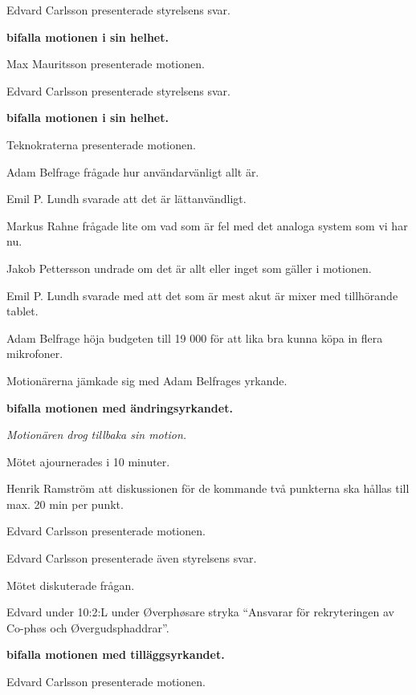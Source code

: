 \documentclass[10pt]{article}
\begin{document}
\begin{paragrafer}
\begin{paragrafer}
    Edvard Carlsson presenterade styrelsens svar.

    \textbf{\Mba bifalla motionen i sin helhet.}

    Max Mauritsson presenterade motionen.

    Edvard Carlsson presenterade styrelsens svar.

    \textbf{\Mba bifalla motionen i sin helhet.}

    Teknokraterna presenterade motionen.

    Adam Belfrage frågade hur användarvänligt allt är.

    Emil P. Lundh svarade att det är lättanvändligt.

    Markus Rahne frågade lite om vad som är fel med det analoga system som vi har nu.

    Jakob Pettersson undrade om det är allt eller inget som gäller i motionen.

    Emil P. Lundh svarade med att det som är mest akut är mixer med tillhörande tablet.

    Adam Belfrage \ypa höja budgeten till 19 000 för att lika bra kunna köpa in flera mikrofoner.

    Motionärerna jämkade sig med Adam Belfrages yrkande.

    \textbf{\Mba bifalla motionen med ändringsyrkandet.}

    
    \textit{Motionären drog tillbaka sin motion.}

    Mötet ajournerades i 10 minuter.

    Henrik Ramström \ypa att diskussionen för de kommande två punkterna ska hållas till max. 20 min 
    per punkt.

    \Mbaby

    Edvard Carlsson presenterade motionen.

    Edvard Carlsson presenterade även styrelsens svar.

    Mötet diskuterade frågan.

    Edvard \ypa under 10:2:L under Øverphøsare stryka ``Ansvarar för rekryteringen av Co-phøs och Øvergudsphaddrar''.

    \textbf{\Mba bifalla motionen med tilläggsyrkandet.} 

    Edvard Carlsson presenterade motionen. 


\end{paragrafer}
\end{paragrafer}
\end{document}
